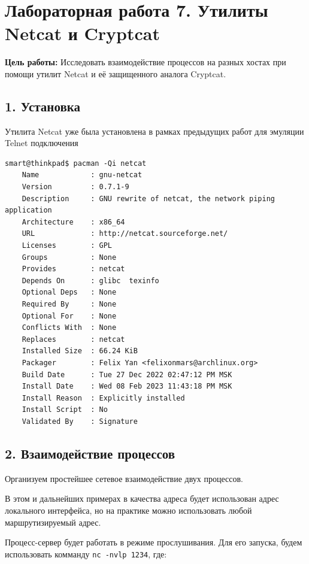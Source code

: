 \chapter*{Лабораторная работа 7. Утилиты Netcat и Cryptcat}

\textbf{Цель работы:} Исследовать взаимодействие процессов на разных хостах при помощи утилит Netcat и её защищенного аналога Cryptcat.

\section*{1. Установка}

Утилита Netcat уже была установлена в рамках предыдущих работ для эмуляции Telnet подключения
\begin{Verbatim}[frame=single]
    smart@thinkpad$ pacman -Qi netcat
    Name            : gnu-netcat
    Version         : 0.7.1-9
    Description     : GNU rewrite of netcat, the network piping application
    Architecture    : x86_64
    URL             : http://netcat.sourceforge.net/
    Licenses        : GPL
    Groups          : None
    Provides        : netcat
    Depends On      : glibc  texinfo
    Optional Deps   : None
    Required By     : None
    Optional For    : None
    Conflicts With  : None
    Replaces        : netcat
    Installed Size  : 66.24 KiB
    Packager        : Felix Yan <felixonmars@archlinux.org>
    Build Date      : Tue 27 Dec 2022 02:47:12 PM MSK
    Install Date    : Wed 08 Feb 2023 11:43:18 PM MSK
    Install Reason  : Explicitly installed
    Install Script  : No
    Validated By    : Signature
\end{Verbatim}

\section*{2. Взаимодействие процессов}

Организуем простейшее сетевое взаимодействие двух процессов.

В этом и дальнейших примерах в качества адреса будет использован адрес локального интерфейса, но на практике можно использовать любой маршрутизируемый адрес.

Процесс-сервер будет работать в режиме прослушивания. Для его запуска, будем использовать комманду \texttt{nc -nvlp 1234}, где:

